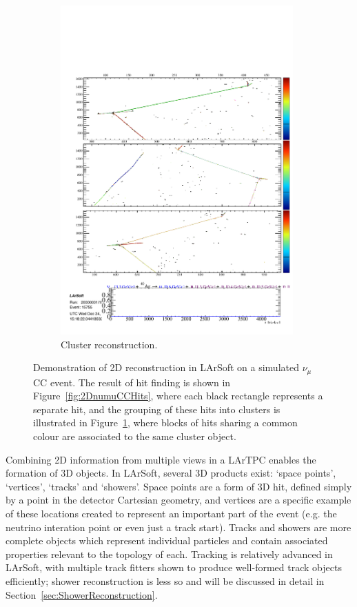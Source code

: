 \begin{figure}
\begin{subfigure}[t]{0.48\linewidth}
    \includegraphics[width=0.98\textwidth]{2DnumuCCClusters.pdf}
    \caption{Cluster reconstruction.}
    \label{fig:2DnumuCCClusters}
  \end{subfigure}
  \caption[Demonstration of 2D reconstruction in LArSoft on a simulated $\nu_{\mu}$CC event.]{Demonstration of 2D reconstruction in LArSoft on a simulated $\nu_{\mu}$CC event.  The result of hit finding is shown in Figure~\ref{fig:2DnumuCCHits}, where each black rectangle represents a separate hit, and the grouping of these hits into clusters is illustrated in Figure~\ref{fig:2DnumuCCClusters}, where blocks of hits sharing a common colour are associated to the same cluster object.}
  \label{fig:2DnumuCC}
\end{figure}

Combining 2D information from multiple views in a LArTPC enables the formation of 3D objects.  In LArSoft, several 3D products exist: `space points', `vertices', `tracks' and `showers'.  Space points are a form of 3D hit, defined simply by a point in the detector Cartesian geometry, and vertices are a specific example of these locations created to represent an important part of the event (e.g. the neutrino interation point or even just a track start).  Tracks and showers are more complete objects which represent individual particles and contain associated properties relevant to the topology of each.  Tracking is relatively advanced in LArSoft, with multiple track fitters shown to produce well-formed track objects efficiently; shower reconstruction is less so and will be discussed in detail in Section~\ref{sec:ShowerReconstruction}.

